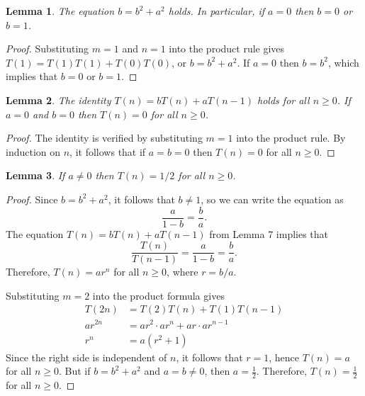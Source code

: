 \documentclass[11pt,fleqn]{amsart}
\newtheorem{lemma}{Lemma}
\begin{document}
\begin{lemma}
The equation $b = b^2 + a^2$ holds. In particular, if $a=0$ then $b=0$ or $b=1$.
\end{lemma}

\begin{proof}
Substituting $m=1$ and $n=1$ into the product rule gives $T(1) = T(1) T(1) + T(0) T(0)$, or $b = b^2 + a^2$.
If $a = 0$ then $b = b^2$, which implies that $b = 0$ or $b = 1$.
\end{proof}

\begin{lemma}
The identity $T(n) = b T(n) + a T(n-1)$ holds for all $n \ge 0$.
If $a = 0$ and $b = 0$ then $T(n) = 0$ for all $n \ge 0$.
\end{lemma}
\begin{proof}
The identity is verified by substituting $m=1$ into the product rule.
By induction on $n$, it follows that if $a = b = 0$ then $T(n) = 0$ for all $n \ge 0$.
\end{proof}


\begin{lemma}If $a \ne 0$ then $T(n) = 1/2$ for all $n\ge0$.
\end{lemma}
\begin{proof}
Since $b = b^2 + a^2$, it follows that $b \ne 1$, so we can write the equation as
$$\frac{a}{1-b} = \frac{b}{a}.$$
The equation $T(n) = bT(n) + aT(n-1)$ from Lemma 7 implies that
$$\frac{T(n)}{T(n-1)} = \frac{a}{1-b} = \frac{b}{a}.$$
Therefore, $T(n) = a r^n$ for all $n \ge 0$, where $r = b/a$.

Substituting $m=2$ into the product formula gives
\begin{align*}
T(2n) &= T(2) T(n) + T(1) T(n-1) \\
ar^{2n} &= ar^2 \cdot ar^n + ar \cdot ar^{n-1} \\
r^{n} &= a(r^2 + 1)
\end{align*}
Since the right side is independent of $n$, it follows that $r = 1$, hence $T(n) = a$ for all $n \ge 0$.
But if $b = b^2 + a^2$ and $a = b \ne 0$, then $a = \frac12$.
Therefore, $T(n) = \frac12$ for all $n \ge 0$.
\end{proof}
\end{document}
